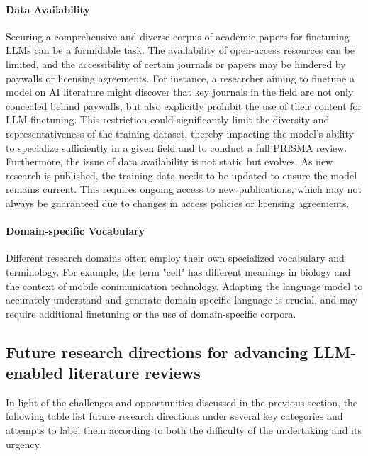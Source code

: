 \documentclass{article}
\begin{document}
\paragraph{Data Availability}

Securing a comprehensive and diverse corpus of academic papers for finetuning LLMs can be a formidable task. The availability of open-access resources can be limited, and the accessibility of certain journals or papers may be hindered by paywalls or licensing agreements. For instance, a researcher aiming to finetune a model on AI literature might discover that key journals in the field are not only concealed behind paywalls, but also explicitly prohibit the use of their content for LLM finetuning. This restriction could significantly limit the diversity and representativeness of the training dataset, thereby impacting the model's ability to specialize sufficiently in a given field and to conduct a full PRISMA review. Furthermore, the issue of data availability is not static but evolves. As new research is published, the training data needs to be updated to ensure the model remains current. This requires ongoing access to new publications, which may not always be guaranteed due to changes in access policies or licensing agreements.


\paragraph{Domain-specific Vocabulary}

Different research domains often employ their own specialized vocabulary and terminology. For example, the term "cell" has different meanings in biology and the context of mobile communication technology. Adapting the language model to accurately understand and generate domain-specific language is crucial, and may require additional finetuning or the use of domain-specific corpora.


\subsection{Future research directions for advancing LLM-enabled literature reviews}

In light of the challenges and opportunities discussed in the previous section, the following table list future research directions under several key categories and attempts to label them according to both the difficulty of the undertaking and its urgency.
\end{document}
